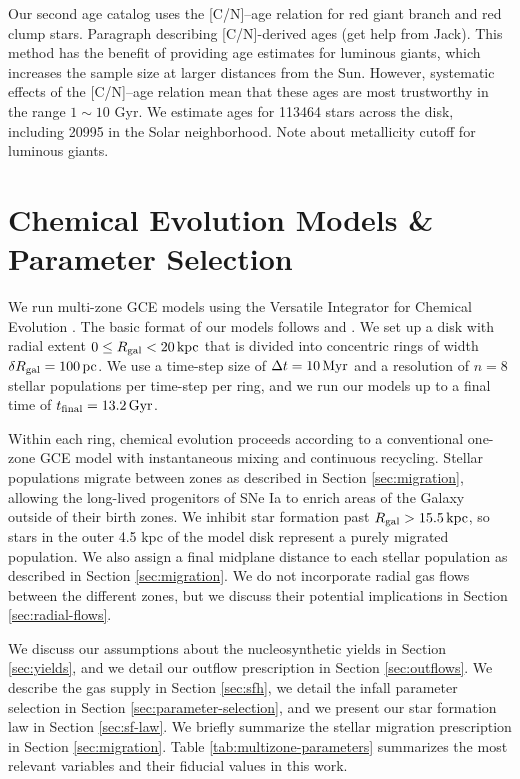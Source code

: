 \documentclass[twocolumn,twocolappendix,linenumbers]{aastex631}
\newcommand{\todo}[1]{{\color{red}#1}}
\begin{document}
Our second age catalog uses the [C/N]--age relation for red giant branch and red clump stars. 
\todo{Paragraph describing [C/N]-derived ages (get help from Jack).}
This method has the benefit of providing age estimates for luminous giants, which increases the sample size at larger distances from the Sun. However, systematic effects of the [C/N]--age relation mean that these ages are most trustworthy in the range $1\sim10$ Gyr. We estimate ages for \num{113464} stars across the disk, including \num{20995} in the Solar neighborhood.
\todo{Note about metallicity cutoff for luminous giants.}

\section{Chemical Evolution Models \& Parameter Selection}
\label{sec:methods}

We run multi-zone GCE models using the Versatile Integrator for Chemical Evolution \citep[{\tt VICE};][]{johnson_impact_2020}. The basic format of our models follows \citet{johnson_stellar_2021} and \citet{dubay_galactic_2024}. We set up a disk with radial extent $0\leq R_{\rm gal}<20\,{\rm kpc}$ that is divided into concentric rings of width $\delta R_{\rm gal}=100\,{\rm pc}$. We use a time-step size of $\Delta t=10\,{\rm Myr}$ and a resolution of $n=8$ stellar populations per time-step per ring, and we run our models up to a final time of $t_{\rm final}=13.2\,{\rm Gyr}$.

Within each ring, chemical evolution proceeds according to a conventional one-zone GCE model with instantaneous mixing and continuous recycling. Stellar populations migrate between zones as described in Section \ref{sec:migration}, allowing the long-lived progenitors of SNe Ia to enrich areas of the Galaxy outside of their birth zones. We inhibit star formation past $R_{\rm gal}>15.5\,{\rm kpc}$, so stars in the outer 4.5 kpc of the model disk represent a purely migrated population. We also assign a final midplane distance to each stellar population as described in Section \ref{sec:migration}. We do not incorporate radial gas flows between the different zones, but we discuss their potential implications in Section \ref{sec:radial-flows}.

We discuss our assumptions about the nucleosynthetic yields in Section \ref{sec:yields}, and we detail our outflow prescription in Section \ref{sec:outflows}. We describe the gas supply in Section \ref{sec:sfh}, we detail the infall parameter selection in Section \ref{sec:parameter-selection}, and we present our star formation law in Section \ref{sec:sf-law}. We briefly summarize the stellar migration prescription in Section \ref{sec:migration}. Table \ref{tab:multizone-parameters} summarizes the most relevant variables and their fiducial values in this work.
\end{document}
